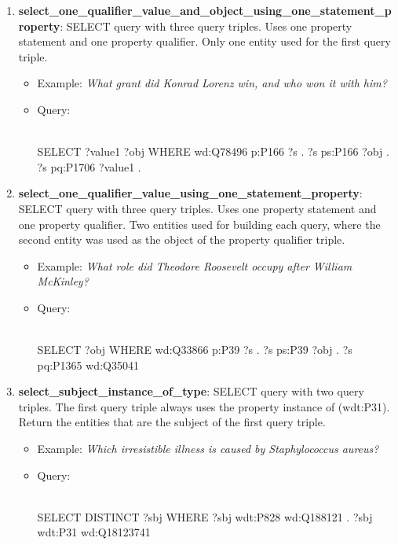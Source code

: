 \begin{enumerate}
    \item \textbf{select\_one\_qualifier\_value\_and\_object\_using\_one\_statement\_property}: SELECT query 
    with three query triples. Uses one property statement and one property qualifier. Only one entity 
    used for the first query triple.
    \begin{itemize}
        \item Example: \textit{What grant did Konrad Lorenz win, and who won it with him?}
        \item Query:\\
        \mbox{}\\
        \begin{sparqlcode}[]
SELECT ?value1 ?obj WHERE { 
    wd:Q78496 p:P166 ?s . 
    ?s ps:P166 ?obj . 
    ?s pq:P1706 ?value1 . 
}
        \end{sparqlcode}
    \end{itemize}
    
    \item \textbf{select\_one\_qualifier\_value\_using\_one\_statement\_property}: SELECT query with three 
    query triples. Uses one property statement and one property qualifier. Two entities used for 
    building each query, where the second entity was used as the object of the property qualifier 
    triple.
    \begin{itemize}
        \item Example: \textit{What role did Theodore Roosevelt occupy after William McKinley?}
        \item Query:\\
        \mbox{}\\
        \begin{sparqlcode}[]
SELECT ?obj WHERE { 
    wd:Q33866 p:P39 ?s . 
    ?s ps:P39 ?obj . 
    ?s pq:P1365 wd:Q35041 
}
        \end{sparqlcode}
    \end{itemize}
    
    \item \textbf{select\_subject\_instance\_of\_type}: SELECT query with two query triples. The first 
    query triple always uses the property instance of (wdt:P31). Return the entities that are the 
    subject of the first query triple.
    \begin{itemize}
        \item Example: \textit{Which irresistible illness is caused by Staphylococcus aureus?}
        \item Query:\\
        \mbox{}\\
        \begin{sparqlcode}[]
SELECT DISTINCT ?sbj WHERE { 
    ?sbj wdt:P828 wd:Q188121 . 
    ?sbj wdt:P31 wd:Q18123741 
}
        \end{sparqlcode}
    \end{itemize}
    

\end{enumerate}
